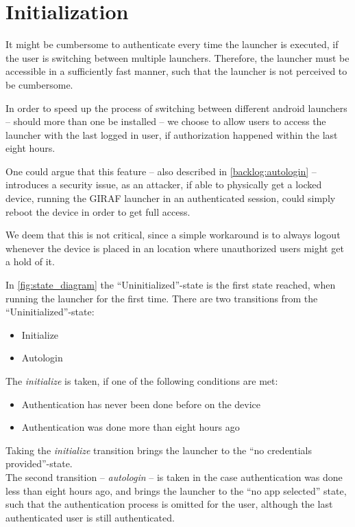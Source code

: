 \section{Initialization}
\label{design:initialization}
It might be cumbersome to authenticate every time the \giraf[] launcher is executed, if the user is switching between multiple launchers. Therefore, the launcher must be accessible in a sufficiently fast manner, such that the launcher is not perceived to be cumbersome.

In order to speed up the process of switching between different android launchers -- should more than one be installed -- we choose to allow users to access the launcher with the last logged in user, if authorization happened within the last eight hours.

One could argue that this feature -- also described in \autoref{backlog:autologin} -- introduces a security issue, as an attacker, if able to physically get a locked device, running the GIRAF launcher in an authenticated session, could simply reboot the device in order to get full access.

We deem that this is not critical, since a simple workaround is to always logout whenever the device is placed in an location where unauthorized users might get a hold of it.

In \autoref{fig:state_diagram} the ``Uninitialized''-state is the first state reached, when running the launcher for the first time. There are two transitions from the ``Uninitialized''-state:

\begin{itemize}
	\item Initialize
	\item Autologin
\end{itemize}

The \emph{initialize} is taken, if one of the following conditions are met: 

\begin{itemize}
	\item Authentication has never been done before on the device
	\item Authentication was done more than eight hours ago
\end{itemize}

Taking the \emph{initialize} transition brings the launcher to the ``no credentials provided''-state. \\

The second transition -- \emph{autologin} -- is taken in the case authentication was done less than eight hours ago, and brings the launcher to the ``no app selected'' state, such that the authentication process is omitted for the user, although the last authenticated user is still authenticated.